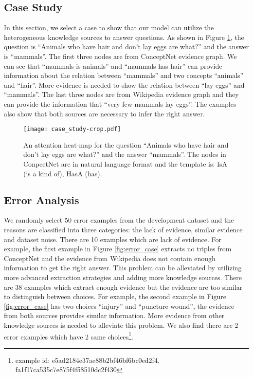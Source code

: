 \documentclass[letterpaper]{article} \usepackage{aaai20}  \usepackage{times}  \usepackage{helvet} \usepackage{courier}  \usepackage[hyphens]{url}  \usepackage{graphicx} \urlstyle{rm} \def\UrlFont{\rm}  \usepackage{graphicx}  \frenchspacing  \setlength{\pdfpagewidth}{8.5in}  \setlength{\pdfpageheight}{11in}
\begin{document}
\subsection{Case Study}


In this section, we select a case to show that our model can utilize the heterogeneous knowledge sources to answer questions. As shown in Figure \ref{fig:case_study}, the question is ``Animals who have hair and don't lay eggs are what?'' and the answer is ``mammals''. The first three nodes are from ConceptNet evidence graph. We can see that ``mammals is animals'' and ``mammals has hair'' can provide information about the relation between ``mammals'' and two concepts ``animals'' and  ``hair''. More evidence is needed to show the relation between ``lay eggs'' and ``mammals''. The last three nodes are from Wikipedia evidence graph and they can provide the information that ``very few mammals lay eggs''. The examples also show that both sources are necessary to infer the right answer.

\begin{figure}[h]
	\centering
	\texttt{[image: case\_study-crop.pdf]}
	\caption{An attention heat-map for the question ``Animals who have hair and don't lay eggs are what?'' and the answer ``mammals''. The nodes in ConpcetNet are in natural language format and the template is: IsA (is a kind of), HasA (has).}
	\label{fig:case_study}
\end{figure}

\subsection{Error Analysis}
We randomly select 50 error examples from the development dataset and the reasons are classified into three categories: the lack of evidence, similar evidence and dataset noise. There are 10 examples which are lack of evidence.
For example, the first example in Figure \ref{fig:error_case} extracts no triples from ConceptNet and the evidence from Wikipedia does not contain enough information to get the right answer. 
This problem can be alleviated by utilizing more advanced extraction strategies and adding more knowledge sources. There are 38 examples which extract enough evidence but the evidence are too similar to distinguish between choices.
For example, the second example in Figure \ref{fig:error_case} has two choices ``injury'' and ``puncture wound'', the evidence from both sources provides similar information.
More evidence from other knowledge sources is needed to alleviate this problem. We also find there are 2 error examples which have 2 same choices\footnote{example id: e5ad2184e37ae88b2bf46bf6bc0ed2f4, fa1f17ca535c7e875f4f58510dc2f430}.
\end{document}
